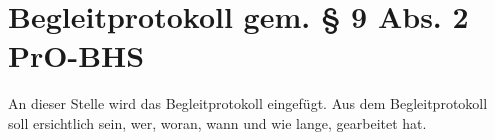 
\chapter*{Begleitprotokoll gem. § 9 Abs. 2 PrO-BHS}


An dieser Stelle wird das Begleitprotokoll eingefügt.
Aus dem Begleitprotokoll soll ersichtlich sein, wer, woran, wann und wie lange, gearbeitet hat.